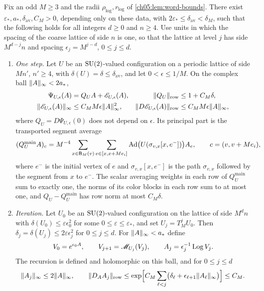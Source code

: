 \begin{lemma}\label{ch05:lem:modified-average}
Fix an odd $M\ge3$ and the radii $\rho_{\log},r_{\log}$ of \cref{ch05:lem:word-bounds}. There exist $\varepsilon_*,a_*,\delta_{\mathrm{av}},C_M>0$, depending only on these data, with $2\varepsilon_*\le\delta_{\mathrm{av}}<\delta_M$, such that the following holds for all integers $d\ge0$ and $n\ge4$. Use units in which the spacing of the coarse lattice of side $n$ is one, so that the lattice at level $j$ has side $M^{d-j}n$ and spacing $\epsilon_j=M^{j-d}$, $0\le j\le d$.
\begin{enumerate}
\item \emph{One step.} Let $U$ be an $\mathrm{SU}(2)$-valued configuration on a periodic lattice of side $Mn'$, $n'\ge4$, with $\delta(U)=\delta\le\delta_{\mathrm{av}}$, and let $0<\epsilon\le1/M$. On the complex ball $\lVert A\rVert_\infty<2a_*$,
\[
 \begin{aligned}
 \Psi_{U,\epsilon}(A)&=Q_UA+\mathscr E_{U,\epsilon}(A),&\lVert Q_U\rVert_{\mathrm{row}}&\le1+C_M\delta,\\
 \lVert \mathscr E_{U,\epsilon}(A)\rVert_\infty&\le C_MM\epsilon\lVert A\rVert_\infty^2,&\lVert D\mathscr E_{U,\epsilon}(A)\rVert_{\mathrm{row}}&\le C_MM\epsilon\lVert A\rVert_\infty,
 \end{aligned}
\]
where $Q_U=D\Psi_{U,\epsilon}(0)$ does not depend on $\epsilon$. Its principal part is the transported segment average
\[
 (Q_U^{\mathrm{main}}A)_c=M^{-4}\sum_{x\in\mathsf B_M(v)}\sum_{e\in[x,x+Me_i]}\operatorname{Ad}\bigl(U(\sigma_{v,x}[x,e^-])\bigr)A_e,\qquad c=(v,v+Me_i),
\]
where $e^-$ is the initial vertex of $e$ and $\sigma_{v,x}[x,e^-]$ is the path $\sigma_{v,x}$ followed by the segment from $x$ to $e^-$. The scalar averaging weights in each row of $Q_U^{\mathrm{main}}$ sum to exactly one, the norms of its color blocks in each row sum to at most one, and $Q_U-Q_U^{\mathrm{main}}$ has row norm at most $C_M\delta$.
\item \emph{Iteration.} Let $U_0$ be an $\mathrm{SU}(2)$-valued configuration on the lattice of side $M^dn$ with $\delta(U_0)\le\varepsilon\epsilon_0^2$ for some $0\le\varepsilon\le\varepsilon_*$, and set $U_j=T_M^jU_0$. Then $\delta_j=\delta(U_j)\le2\varepsilon\epsilon_j^2$ for $0\le j\le d$. For $\lVert A\rVert_\infty<a_*$ define
\[
 V_0=e^{\epsilon_0A},\qquad V_{j+1}=\mathscr M_{U_j}(V_j),\qquad A_j=\epsilon_j^{-1}\operatorname{Log} V_j.
\]
The recursion is defined and holomorphic on this ball, and for $0\le j\le d$
\[
 \lVert A_j\rVert_\infty\le2\lVert A\rVert_\infty,\qquad
 \lVert D_AA_j\rVert_{\mathrm{row}}\le\exp\Bigl[C_M\sum_{\ell<j}\bigl(\delta_\ell+\epsilon_{\ell+1}\lVert A_\ell\rVert_\infty\bigr)\Bigr]\le C_M.
\]
\end{enumerate}
\end{lemma}
